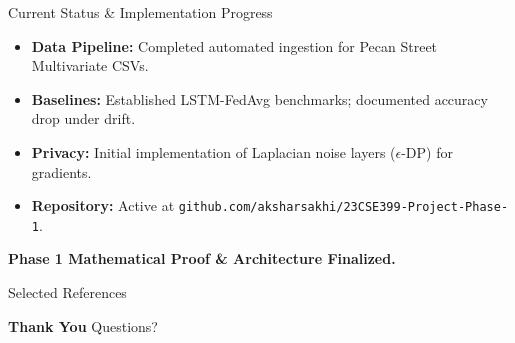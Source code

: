 \documentclass[aspectratio=169, 11pt]{beamer}
\begin{document}
\begin{frame}{Current Status \& Implementation Progress}
    \begin{itemize}
        \item \textbf{Data Pipeline:} Completed automated ingestion for Pecan Street Multivariate CSVs.
        \item \textbf{Baselines:} Established LSTM-FedAvg benchmarks; documented accuracy drop under drift.
        \item \textbf{Privacy:} Initial implementation of Laplacian noise layers ($\epsilon$-DP) for gradients.
        \item \textbf{Repository:} Active at \texttt{github.com/aksharsakhi/23CSE399-Project-Phase-1}.
    \end{itemize}
    \centering
    \vspace{0.3cm}
    \textbf{Phase 1 Mathematical Proof \& Architecture Finalized.}
\end{frame}

\begin{frame}[allowframebreaks]{Selected References}
    \tiny
    \nocite{mcmahan2017,arivazhagan2020,jothimurugesan2022,larocca2021attention}
    
    
\end{frame}

\begin{frame}
    \centering
    {\Huge \textbf{\textcolor{amritaMaroon}{Thank You}}}
    \vspace{1cm}
    {\large Questions?}
\end{frame}
\end{document}
